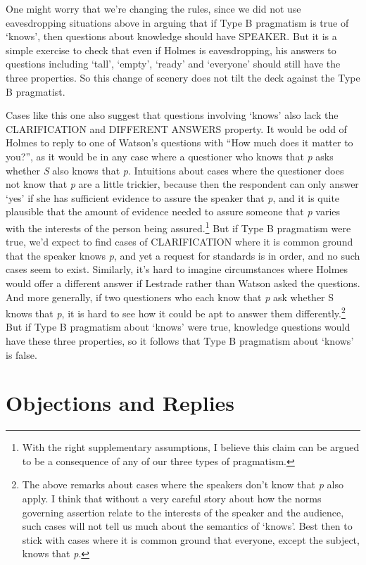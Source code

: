 \documentclass[
  11pt,
  letterpaper,
  DIV=11,
  numbers=noendperiod,
  twoside]{scrartcl}
\begin{document}
One might worry that we're changing the rules, since we did not use
eavesdropping situations above in arguing that if Type B pragmatism is
true of `knows', then questions about knowledge should have SPEAKER. But
it is a simple exercise to check that even if Holmes is eavesdropping,
his answers to questions including `tall', `empty', `ready' and
`everyone' should still have the three properties. So this change of
scenery does not tilt the deck against the Type B pragmatist.

Cases like this one also suggest that questions involving `knows' also
lack the CLARIFICATION and DIFFERENT ANSWERS property. It would be odd
of Holmes to reply to one of Watson's questions with ``How much does it
matter to you?'', as it would be in any case where a questioner who
knows that \emph{p} asks whether \emph{S} also knows that \emph{p}.
Intuitions about cases where the questioner does not know that \emph{p}
are a little trickier, because then the respondent can only answer `yes'
if she has sufficient evidence to assure the speaker that \emph{p}, and
it is quite plausible that the amount of evidence needed to assure
someone that \emph{p} varies with the interests of the person being
assured.\footnote{With the right supplementary assumptions, I believe
  this claim can be argued to be a consequence of any of our three types
  of pragmatism.} But if Type B pragmatism were true, we'd expect to
find cases of CLARIFICATION where it is common ground that the speaker
knows \emph{p}, and yet a request for standards is in order, and no such
cases seem to exist. Similarly, it's hard to imagine circumstances where
Holmes would offer a different answer if Lestrade rather than Watson
asked the questions. And more generally, if two questioners who each
know that \emph{p} ask whether S knows that \emph{p}, it is hard to see
how it could be apt to answer them differently.\footnote{The above
  remarks about cases where the speakers don't know that \emph{p} also
  apply. I think that without a very careful story about how the norms
  governing assertion relate to the interests of the speaker and the
  audience, such cases will not tell us much about the semantics of
  `knows'. Best then to stick with cases where it is common ground that
  everyone, except the subject, knows that \emph{p}.} But if Type B
pragmatism about `knows' were true, knowledge questions would have these
three properties, so it follows that Type B pragmatism about `knows' is
false.

\section{Objections and Replies}\label{objections-and-replies}
\end{document}
